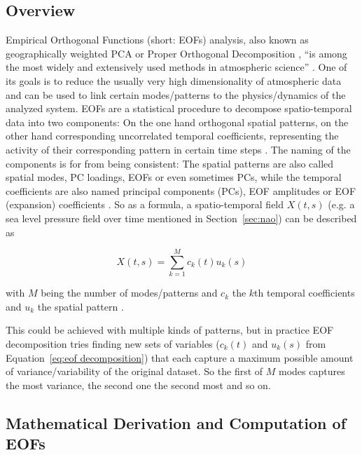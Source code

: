 \subsection{Overview}

Empirical Orthogonal Functions (short: EOFs) analysis, also known as geographically weighted PCA or Proper Orthogonal Decomposition \cite{vietinghoffdiss}, \enquote{is among the most widely and extensively used methods in atmospheric science} \cite{hannachi_empirical_2007}. 
One of its goals is to reduce the usually very high dimensionality of atmospheric data and can be used to link certain modes/patterns to the physics/dynamics of the analyzed system.  
EOFs are a statistical procedure to decompose spatio-temporal data into two components: On the one hand orthogonal spatial patterns, on the other hand corresponding uncorrelated temporal coefficients, representing the activity of their corresponding pattern in certain time steps \cite{hannachi_empirical_2007, vietinghoffdiss}. 
The naming of the components is for from being consistent: The spatial patterns are also called spatial modes, PC loadings, EOFs or even sometimes PCs, while the temporal coefficients are also named principal components (PCs), EOF amplitudes or EOF (expansion) coefficients \cite{hannachi_empirical_2007}. 
So as a formula, a spatio-temporal field $X(t, s)$ (e.g. a sea level pressure field over time mentioned in Section~\ref{sec:nao}) can be described as

\begin{equation}
  X(t, s) = \sum^{M}_{k=1} c_k(t) u_k(s)
  \label{eq:eof decomposition}
\end{equation}

with $M$ being the number of modes/patterns and  $c_k$ the $k$th temporal coefficients and $u_k$ the spatial pattern \cite{hannachi_empirical_2007}. 

This could be achieved with multiple kinds of patterns, but in practice EOF decomposition tries finding new sets of variables ($c_k(t)$ and $u_k(s)$ from Equation~\ref{eq:eof decomposition}) that each capture a maximum possible amount of variance/variability of the original dataset. 
So the first of $M$ modes captures the most variance, the second one the second most and so on. 

\subsection{Mathematical Derivation and Computation of EOFs}

